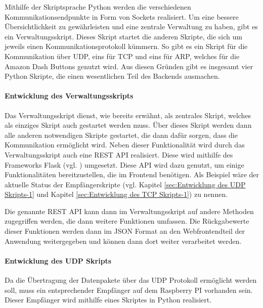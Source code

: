 Mithilfe der Skriptsprache Python werden die verschiedenen Kommunikationsendpunkte in Form von Sockets realisiert. Um eine bessere Übersichtlichkeit zu gewährleisten und eine zentrale Verwaltung zu haben, gibt es ein Verwaltungsskript. Dieses Skript startet die anderen Skripte, die sich um jeweils einen Kommunikationsprotokoll kümmern. So gibt es ein Skript für die Kommunikation über \ac{UDP}, eins für \ac{TCP} und eins für \ac{ARP}, welches für die Amazon Dash Buttons genutzt wird. Aus diesen Gründen gibt es insgesamt vier Python Skripte, die einen wesentlichen Teil des Backends ausmachen.

\paragraph{Entwicklung des Verwaltungsskripts}$\;$ \\  
\label{sec:Entwicklung des Verwaltungsskripts-1} 
Das Verwaltungsskript dienst, wie bereits erwähnt, als zentrales Skript, welches als einziges Skript auch gestartet werden muss. Über dieses Skript werden dann alle anderen notwendigen Skripte gestartet, die dann dafür sorgen, dass die Kommunikation ermöglicht wird. 
Neben dieser Funktionalität wird durch das Verwaltungsskript auch eine \ac{REST} \ac{API} realisiert. Diese wird mithilfe des Frameworks Flask (vgl. \cite{.s}) umgesetzt. Diese \ac{API} wird dazu genutzt, um einige Funktionalitäten bereitzustellen, die im Frontend benötigen. Als Beispiel wäre der aktuelle Status der Empfängerskripte (vgl. Kapitel \ref{sec:Entwicklung des UDP Skripts-1} und Kapitel \ref{sec:Entwicklung des TCP Skripts-1}) zu nennen. 

Die genannte \ac{REST} \ac{API} kann dann im Verwaltungsskript auf andere Methoden zugegriffen werden, die dann weitere Funktionen umfassen. Die Rückgabewerte dieser Funktionen werden dann im \ac{JSON} Format an den Webfrontendteil der Anwendung weitergegeben und können dann dort weiter verarbeitet werden. 

\paragraph{Entwicklung des UDP Skripts}$\;$ \\  
\label{sec:Entwicklung des UDP Skripts-1} 
Da die Übertragung der Datenpakete über das \ac{UDP} Protokoll ermöglicht werden soll, muss ein entsprechender Empfänger auf dem Raspberry PI vorhanden sein. Dieser Empfänger wird mithilfe eines Skriptes in Python realisiert.

